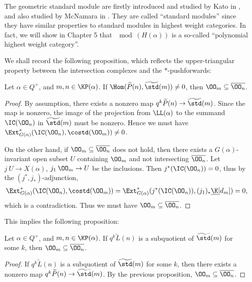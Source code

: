 The geometric standard module are firstly introduced and studied by Kato 
in \cite{K2}, and also studied by McNamara in \cite{Mc2}.
They are called ``standard modules'' since they have similar
properties to standard modules in highest weight categories.
In fact, we will show in Chapter 5 that $\mod(H(\alpha))$
is a so-called ``polynomial highest weight category''.

We shall record the following proposition, which reflects the
upper-triangular property between the intersection complexes and the $*$-pushforwards:

\begin{proposition}
    Let $\alpha\in Q^+$, and $m,n\in\KP(\alpha)$.
    If $\Hom(\widetilde{P}(n),\widetilde{\std}(m))\ne 0$,
    then $\OO_m\subseteq\overline{\OO_n}$.
\end{proposition}

\begin{proof}
    By assumption, there exists a nonzero map
    $q^k\widetilde{P}(n)\to\widetilde{\std}(m)$. Since the map is nonzero,
    the image of the projection from $\LL(\alpha)$ to the summand $\IC(\OO_n)$
    in $\widetilde{\std}(m)$ must be nonzero. Hence we must have 
    $\Ext^*_{G(\alpha)}(\IC(\OO_n),\costd(\OO_m))\ne 0$.

    On the other hand, if $\OO_m\subseteq\overline{\OO_n}$ does not hold,
    then there exists a $G(\alpha)$-invariant open subset $U$ containing
    $\OO_m$ and not intersecting $\overline{\OO_n}$. Let $j\:U\to
    X(\alpha)$, $j_1\:\OO_m\to U$  be the inclusions. Then $j^*(\IC(\OO_n)) = 0$,
    thus by the $(j^*,j_*)$-adjunction,
    \[
        \Ext^*_{G(\alpha)}(\IC(\OO_n),\costd(\OO_m)) = \Ext^*_{G(\alpha)}(j^*(\IC(\OO_n)),
        (j_1)_*\underline{\K}[d_m]) = 0,
    \] which is a contradiction.
    Thus we must have $\OO_m\subseteq\overline{\OO_n}$.
\end{proof}

This implies the following proposition:

\begin{proposition}\cite[Proposition 4.5]{Mc2}\label{comp-of-geo-std}
    Let $\alpha\in Q^+$, and $m,n\in\KP(\alpha)$.
    If $q^k\widetilde{L}(n)$ is a subquotient of 
    $\widetilde{\std}(m)$ for some $k$, then $\OO_m\subseteq\overline{\OO_n}$.
\end{proposition}

\begin{proof}
    If $q^k\widetilde{L}(n)$ is a subquotient of 
    $\widetilde{\std}(m)$ for some $k$, then there exists a nonzero map
    $q^k\widetilde{P}(n)\to\widetilde{\std}(m)$. By the previous proposition,
    $\OO_m\subseteq\overline{\OO_n}$.
\end{proof}

